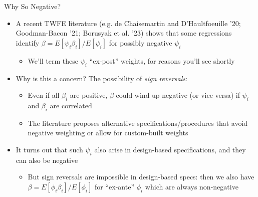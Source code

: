 \documentclass[11pt,english]{beamer}
\begin{document}
\begin{frame}{Why So Negative?}

\begin{itemize}
\item A recent TWFE literature (e.g. de Chaisemartin and D'Haultfoeuille '20; Goodman-Bacon '21; Borusyak et al. '23) shows that some regressions identify $\beta = E[\psi_i \beta_i]/E[\psi_i]$ for possibly negative $\psi_i$\smallskip\pause{}
\begin{itemize}
\item We'll term these $\psi_i$ ``ex-post'' weights, for reasons you'll see shortly\bigskip\pause{}
\end{itemize}
\item Why is this a concern? The possibility of \emph{sign reversals}:\smallskip
\begin{itemize}
\item Even if all $\beta_i$ are positive, $\beta$ could wind up negative (or vice versa) if $\psi_i$ and $\beta_i$ are correlated \smallskip
\item The literature proposes alternative specifications/procedures that avoid negative weighting or allow for custom-built weights
\end{itemize}\bigskip\pause{}
\item It turns out that such $\psi_i$ also arise in design-based specifications, and they can also be negative\smallskip
\begin{itemize}
\item But sign reversals are impossible in design-based specs: then we also have $\beta=E[\phi_i\beta_i]/E[\phi_i]$ for ``ex-ante'' $\phi_i$ which are always non-negative
\end{itemize}
\end{itemize}

\end{frame}
\end{document}
